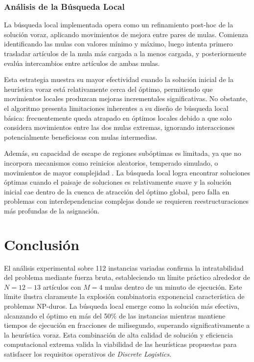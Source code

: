 \documentclass[12pt, a4paper]{article}
\begin{document}
    \subsubsection{Análisis de la Búsqueda Local }
    La búsqueda local implementada opera como un refinamiento post-hoc de la solución voraz, aplicando movimientos de mejora entre pares de mulas. Comienza identificando las mulas con valores mínimo y máximo, luego intenta primero trasladar artículos de la mula más cargada a la menos cargada, y posteriormente evalúa intercambios entre artículos de ambas mulas.

    Esta estrategia muestra su mayor efectividad cuando la solución inicial de la heurística voraz está relativamente cerca del óptimo, permitiendo que movimientos locales produzcan mejoras incrementales significativas. No obstante, el algoritmo presenta limitaciones inherentes a su diseño de búsqueda local básica: frecuentemente queda atrapado en óptimos locales debido a que solo considera movimientos entre las dos mulas extremas, ignorando interacciones potencialmente beneficiosas con mulas intermedias.

    Además, su capacidad de escape de regiones subóptimas es limitada, ya que no incorpora mecanismos como reinicios aleatorios, temperado simulado, o movimientos de mayor complejidad . La búsqueda local logra encontrar soluciones óptimas cuando el paisaje de soluciones es relativamente suave y la solución inicial cae dentro de la cuenca de atracción del óptimo global, pero falla en problemas con interdependencias complejas donde se requieren reestructuraciones más profundas de la asignación.

    \section{Conclusión}
    El análisis experimental sobre 112 instancias variadas confirma la intratabilidad del problema mediante fuerza bruta, estableciendo un límite práctico alrededor de $N=12{-}13$ artículos con $M=4$ mulas dentro de un minuto de ejecución. Este límite ilustra claramente la explosión combinatoria exponencial característica de problemas NP-duros. La búsqueda local emerge como la solución más efectiva, alcanzando el óptimo en más del 50\% de las instancias mientras mantiene tiempos de ejecución en fracciones de milisegundo, superando significativamente a la heurística voraz. Esta combinación de alta calidad de solución y eficiencia computacional extrema valida la viabilidad de las heurísticas propuestas para satisfacer los requisitos operativos de \textit{Discrete Logistics}.
\end{document}
